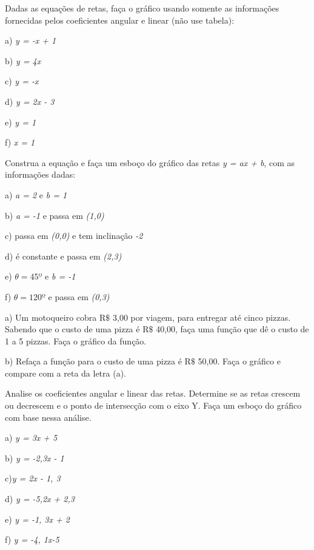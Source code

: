\begin{exercicios}
\exitem{} Dadas as equações de retas, faça o gráfico usando somente as informações fornecidas pelos coeficientes angular e linear (não use tabela):

\begin{multicols}{2}
a) \textit{y = -x + 1}

b) \textit{y = 4x}

c) \textit{y = -x}

d)  \textit{y = 2x - 3}

e) \textit{y = 1}

f) \textit{x = 1}
\end{multicols}

\exitem{} Construa a equação e faça um esboço do gráfico das retas \textit{y = ax + b}, com as informações dadas:

\begin{multicols}{2}
a) \textit{a = 2} e \textit{b = 1}

b) \textit{a = -1}  e passa em \textit{(1,0)}

c) passa em \textit{(0,0)} e tem inclinação \textit{-2}

d) é constante e passa em \textit{(2,3)}

e)  $\theta = 45º$ e \textit{b = -1}

f)  $\theta = 120º$  e  passa em \textit{(0,3)}
\end{multicols}

\exitem{} a) Um motoqueiro cobra R$\$$  3,00 por viagem, para entregar até cinco pizzas. Sabendo que o custo de uma pizza é R$\$$  40,00, faça uma função que dê o custo de 1 a 5 pizzas. Faça o gráfico da função.

b) Refaça a função para o custo de uma pizza é R$\$$  50,00. Faça o gráfico e compare com a reta da letra (a).

\exitem{} Analise os coeficientes angular e linear das retas. Determine se as retas crescem ou decrescem e o ponto de intersecção com o eixo Y. Faça um esboço do gráfico com base nessa análise.

\begin{multicols}{3}
a) \textit{y = 3x + 5}

b) \textit{y = -2,3x - 1}

c)\textit{y = 2x - 1, 3}

d) \textit{y = -5,2x + 2,3}

e) \textit{y = -1, 3x + 2}

f) \textit{y = -4, 1x-5}
\end{multicols}


\end{exercicios}
